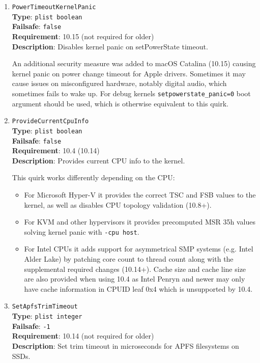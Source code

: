 \documentclass[]{article}
\providecommand{\tightlist}{%
  \setlength{\itemsep}{0pt}\setlength{\parskip}{0pt}}
\begin{document}
\begin{enumerate}
\item
  \texttt{PowerTimeoutKernelPanic}\\
  \textbf{Type}: \texttt{plist\ boolean}\\
  \textbf{Failsafe}: \texttt{false}\\
  \textbf{Requirement}: 10.15 (not required for older)\\
  \textbf{Description}: Disables kernel panic on setPowerState timeout.

  An additional security measure was added to macOS Catalina (10.15) causing
  kernel panic on power change timeout for Apple drivers. Sometimes it may cause
  issues on misconfigured hardware, notably digital audio, which sometimes fails
  to wake up. For debug kernels \texttt{setpowerstate\_panic=0} boot argument
  should be used, which is otherwise equivalent to this quirk.

\item
  \texttt{ProvideCurrentCpuInfo}\\
  \textbf{Type}: \texttt{plist\ boolean}\\
  \textbf{Failsafe}: \texttt{false}\\
  \textbf{Requirement}: 10.4 (10.14)\\
  \textbf{Description}: Provides current CPU info to the kernel.

  This quirk works differently depending on the CPU:

  \begin{itemize}
  \tightlist
  \item For Microsoft Hyper-V it provides the correct TSC and FSB values
    to the kernel, as well as disables CPU topology validation (10.8+).
  \item For KVM and other hypervisors it provides precomputed MSR 35h
    values solving kernel panic with \texttt{-cpu host}.
  \item For Intel CPUs it adds support for asymmetrical SMP systems
    (e.g. Intel Alder Lake) by patching core count to thread count along
    with the supplemental required changes (10.14+). Cache size and cache
    line size are also provided when using 10.4 as Intel Penryn and newer
    may only have cache information in CPUID leaf 0x4 which is unsupported
    by 10.4.
  \end{itemize}

\item
  \texttt{SetApfsTrimTimeout}\\
  \textbf{Type}: \texttt{plist\ integer}\\
  \textbf{Failsafe}: \texttt{-1}\\
  \textbf{Requirement}: 10.14 (not required for older)\\
  \textbf{Description}: Set trim timeout in microseconds for APFS filesystems on SSDs.


\end{enumerate}
\end{document}
